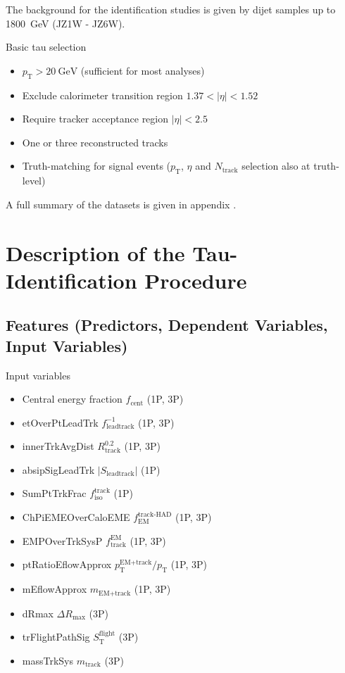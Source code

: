  The background for the identification studies is given by
dijet samples up to \SI{1800}{\giga\electronvolt} (JZ1W - JZ6W). 

Basic tau selection
\begin{itemize}
\item $p_\text{T} > \SI{20}{\giga\electronvolt}$ (sufficient for most analyses)
\item Exclude calorimeter transition region $1.37 < |\eta| < 1.52$
\item Require tracker acceptance region $|\eta| < 2.5$
\item One or three reconstructed tracks
\item Truth-matching for signal events ($p_\text{T}$, $\eta$ and
  $N_\text{track}$ selection also at truth-level)
\end{itemize}



A full summary of the datasets is given in appendix .

\section{Description of the Tau-Identification Procedure}
\label{sec:bdt_tauid}

\subsection{Features (Predictors, Dependent Variables, Input Variables)}
\label{sec:bdt_features}

Input variables
\begin{itemize}
\item Central energy fraction $f_\text{cent}$ (1P, 3P)
\item etOverPtLeadTrk $f_\text{leadtrack}^{-1}$ (1P, 3P)
\item innerTrkAvgDist $R_\text{track}^{0.2}$ (1P, 3P)
\item absipSigLeadTrk $\left| S_\text{leadtrack} \right|$ (1P)
\item SumPtTrkFrac $f_\text{iso}^\text{track}$ (1P)
\item ChPiEMEOverCaloEME $f_\text{EM}^\text{track-HAD}$ (1P, 3P)
\item EMPOverTrkSysP $f_\text{track}^\text{EM}$ (1P, 3P)
\item ptRatioEflowApprox $p_\text{T}^\text{EM+track} / p_\text{T}$ (1P, 3P)
\item mEflowApprox $m_\text{EM+track}$ (1P, 3P)
\item dRmax $\Delta R_\text{max}$ (3P)
\item trFlightPathSig $S_\text{T}^\text{flight}$ (3P)
\item massTrkSys $m_\text{track}$ (3P)
\end{itemize}

